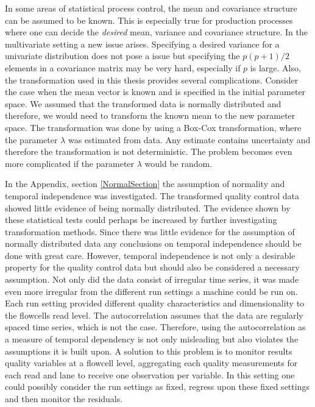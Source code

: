 In some areas of statistical process control, the mean and covariance structure can be assumed to be known. This is especially true for production processes where one can decide the \textit{desired} mean, variance and covariance structure. In the multivariate setting a new issue arises. Specifying a desired variance for a univariate distribution does not pose a issue but specifying the $p(p+1)/2$ elements in a covariance matrix may be very hard, especially if $p$ is large. Also, the transformation used in this thesis provides several complications. Consider the case when the mean vector is known and is specified in the initial parameter space. We assumed that the transformed data is normally distributed and therefore, we would need to transform the known mean to the new parameter space. The transformation was done by using a Box-Cox transformation, where the parameter $\lambda$ was estimated from data. Any estimate contains uncertainty and therefore the transformation is not deterministic. The problem becomes even more complicated if the parameter $\lambda$ would be random. 

In the Appendix, section \ref{NormalSection} the assumption of normality and temporal independence was investigated. The transformed quality control data showed little evidence of being normally distributed. The evidence shown by these statistical tests could perhaps be increased by further investigating transformation methods. Since there was little evidence for the assumption of normally distributed data any conclusions on temporal independence should be done with great care. However, temporal independence is not only a desirable property for the quality control data but should also be considered a necessary assumption. Not only did the data consist of irregular time series, it was made even more irregular from the different run settings a machine could be run on. Each run setting provided different quality characteristics and dimensionality to the flowcells read level. The autocorrelation assumes that the data are regularly spaced time series, which is not the case. Therefore, using the autocorrelation as a measure of temporal dependency is not only misleading but also violates the assumptions it is built upon.
A solution to this problem is to monitor results quality variables at a flowcell level, aggregating each quality measurements for each read and lane to receive one observation per variable. In this setting one could possibly consider the run settings as fixed, regress upon these fixed settings and then monitor the residuals. 

